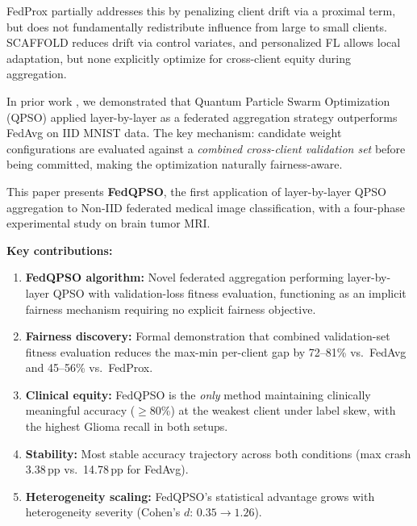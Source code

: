 \documentclass[conference]{IEEEtran}
\begin{document}
FedProx \cite{li2020fedprox} partially addresses this by penalizing client
drift via a proximal term, but does not fundamentally redistribute influence
from large to small clients. SCAFFOLD \cite{karimireddy2020scaffold} reduces
drift via control variates, and personalized FL \cite{kulkarni2020pfl} allows
local adaptation, but none explicitly optimize for cross-client equity during
aggregation.

In prior work \cite{edla2025mnist}, we demonstrated that Quantum Particle
Swarm Optimization (QPSO) \cite{sun2004qpso} applied layer-by-layer as a
federated aggregation strategy outperforms FedAvg on IID MNIST data. The
key mechanism: candidate weight configurations are evaluated against a
\emph{combined cross-client validation set} before being committed, making
the optimization naturally fairness-aware.

This paper presents \textbf{FedQPSO}, the first application of layer-by-layer
QPSO aggregation to Non-IID federated medical image classification, with
a four-phase experimental study on brain tumor MRI.

\textbf{Key contributions:}
\begin{enumerate}
    \item \textbf{FedQPSO algorithm:} Novel federated aggregation performing
    layer-by-layer QPSO with validation-loss fitness evaluation, functioning
    as an implicit fairness mechanism requiring no explicit fairness objective.

    \item \textbf{Fairness discovery:} Formal demonstration that combined
    validation-set fitness evaluation reduces the max-min per-client gap by
    72--81\% vs.\ FedAvg and 45--56\% vs.\ FedProx.

    \item \textbf{Clinical equity:} FedQPSO is the \emph{only} method
    maintaining clinically meaningful accuracy ($\geq$80\%) at the weakest
    client under label skew, with the highest Glioma recall in both setups.

    \item \textbf{Stability:} Most stable accuracy trajectory across both
    conditions (max crash 3.38\,pp vs.\ 14.78\,pp for FedAvg).

    \item \textbf{Heterogeneity scaling:} FedQPSO's statistical advantage
    grows with heterogeneity severity (Cohen's $d$: $0.35 \to 1.26$).
\end{enumerate}
\end{document}
